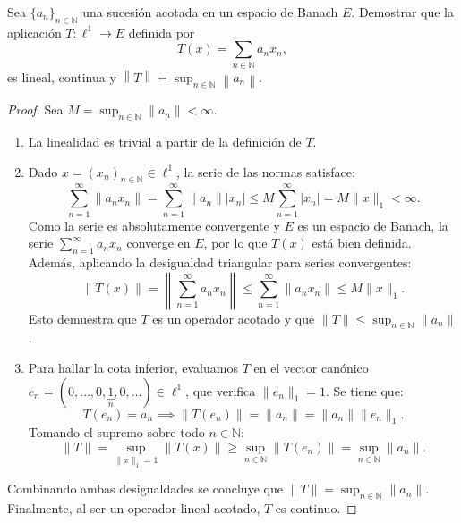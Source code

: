 \documentclass{article}
\theoremstyle{definition}
\newcommand{\N}{\mathbb{N}}
\newcommand{\norm}[1]{\left\lVert #1 \right\rVert}       %
\newenvironment{ejercicio}[1]{\begin{trivlist}
\item[\hskip \labelsep {\bfseries Ejercicio}\hskip \labelsep {\bfseries #1.}]}{\end{trivlist}}
\begin{document}
\begin{ejercicio}{7}
    Sea \({\{a_n\}}_{n\in\N}\) una sucesión acotada en un espacio de Banach \(E\). Demostrar que la aplicación \(T:\ell^1\to E\) definida por
    \[
        T(x)=\sum_{n\in\N} a_n x_n,
    \]
    es lineal, continua y \(\norm{T}=\sup_{n\in\N}\norm{a_n}\).
\end{ejercicio}
\begin{proof}
    Sea \( M = \sup_{n\in\N} \|a_n\| < \infty \).

    \begin{enumerate}
        \item La linealidad es trivial a partir de la definición de \(T\).
        \item Dado \( x = {(x_n)}_{n \in \N} \in \ell^1\), la serie de las normas satisface:
              \[
                  \sum_{n=1}^\infty \|a_n x_n\| = \sum_{n=1}^\infty \|a_n\| |x_n| \le M \sum_{n=1}^\infty |x_n| = M \|x\|_1 < \infty.
              \]
              Como la serie es absolutamente convergente y \(E\) es un espacio de Banach, la serie \(\sum_{n=1}^\infty a_n x_n\) converge en \(E\), por lo que \(T(x)\) está bien definida. Además, aplicando la desigualdad triangular para series convergentes:
              \[
                  \|T(x)\| = \left \| \sum_{n=1}^\infty a_n x_n \right \| \le \sum_{n=1}^\infty \|a_n x_n\| \le M \|x\|_1.
              \]
              Esto demuestra que \(T\) es un operador acotado y que \( \|T\| \le \sup_{n\in\N} \|a_n\| \).

        \item Para hallar la cota inferior, evaluamos \(T\) en el vector canónico \(e_n = (0, \dots, 0, \underbrace{1}_{n}, 0, \dots) \in \ell^1\), que verifica \( \|e_n\|_1 = 1\). Se tiene que:
              \[
                  T(e_n) = a_n \implies \|T(e_n)\| = \|a_n\| = \|a_n\| \|e_n\|_1.
              \]
              Tomando el supremo sobre todo \( n \in \N \):
              \[
                  \|T\| = \sup_{\|x\|_1 = 1} \|T(x)\| \ge \sup_{n\in\N} \|T(e_n)\| = \sup_{n\in\N} \|a_n\|.
              \]
    \end{enumerate}

    Combinando ambas desigualdades se concluye que \( \|T\| = \sup_{n\in\N} \|a_n\| \). Finalmente, al ser un operador lineal acotado, \(T\) es continuo.
\end{proof}

\vspace{0.5cm}
\end{document}
